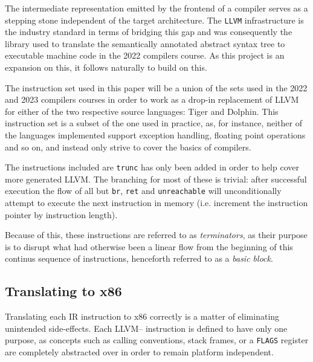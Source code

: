 \documentclass{article}
\begin{document}
The intermediate representation emitted by the frontend of a compiler serves as a stepping stone independent of the target architecture. The \lstinline!LLVM! infrastructure is the industry standard in terms of bridging this gap and was consequently the library used to translate the semantically annotated abstract syntax tree to executable machine code in the 2022 compilers course. As this project is an expansion on this, it follows naturally to build on this. 

The instruction set used in this paper will be a union of the sets used in the 2022 and 2023 compilers courses in order to work as a drop-in replacement of LLVM for either of the two respective source languages:  Tiger and Dolphin. This instruction set is a subset of the one used in practice, as, for instance, neither of the languages implemented support exception handling, floating point operations and so on, and instead only strive to cover the basics of compilers.

The instructions included are
\lstinline!trunc! has only been added in order to help cover more generated LLVM.
The branching for most of these is trivial: after successful execution the flow of all but \lstinline!br!, \lstinline!ret! and \lstinline!unreachable! will unconditionally attempt to execute the next instruction in memory (i.e. increment the instruction pointer by instruction length).

Because of this, these instructions are referred to as \textit{terminators}, as their purpose is to disrupt what had otherwise been a linear flow from the beginning of this continus sequence of instructions, henceforth referred to as a \textit{basic block}.

\subsection{Translating to x86}

Translating each IR instruction to x86 correctly is a matter of eliminating unintended side-effects. Each LLVM-- instruction is defined to have only one purpose, %
as concepts such as calling conventions, stack frames, or a \lstinline!FLAGS! register are completely abstracted over in order to remain platform independent.
\end{document}
